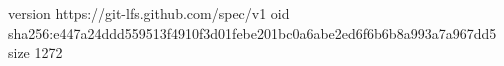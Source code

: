 version https://git-lfs.github.com/spec/v1
oid sha256:e447a24ddd559513f4910f3d01febe201bc0a6abe2ed6f6b6b8a993a7a967dd5
size 1272
